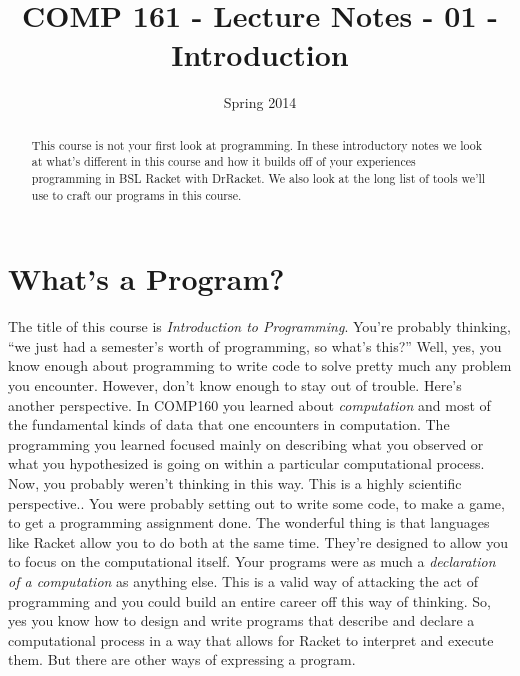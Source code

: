 \documentclass[]{tufte-handout}
\title{COMP 161 - Lecture Notes - 01 - Introduction}
\date{Spring 2014}
\begin{document}
\maketitle

\begin{abstract}
This course is not your first look at programming. In these introductory notes we look at what's different in this course and how it builds off of your experiences programming in BSL Racket with DrRacket.  We also look at the long list of tools we'll use to craft our programs in this course. 
\end{abstract}

\section{What's a Program?}

The title of this course is \textit{Introduction to Programming}.  You're probably thinking, ``we just had a semester's worth of programming, so what's this?''  Well, yes, you know enough about programming to write code to solve pretty much any problem you encounter. However, don't know enough to stay out of trouble.  Here's another perspective.  In COMP160 you learned about \textit{computation} and most of the fundamental kinds of data  that one encounters in computation.  The programming you learned focused mainly on describing what you observed or what you hypothesized is going on within a particular computational process.  Now, you probably weren't thinking in this way. This is a highly scientific perspective..   You were probably setting out to write some code, to make a game, to get a programming assignment done.  The wonderful thing is that languages like Racket allow you to do both at the same time.  They're designed to allow you to focus on the computational itself.  Your programs were as much a \textit{declaration of a computation} as anything else.  This is a valid way of attacking the act of programming and you could build an entire career off this way of thinking.  So, yes you know how to design and write programs that describe and declare a computational process in a way that allows for Racket to interpret and execute them. But there are other ways of expressing a program.
\end{document}
